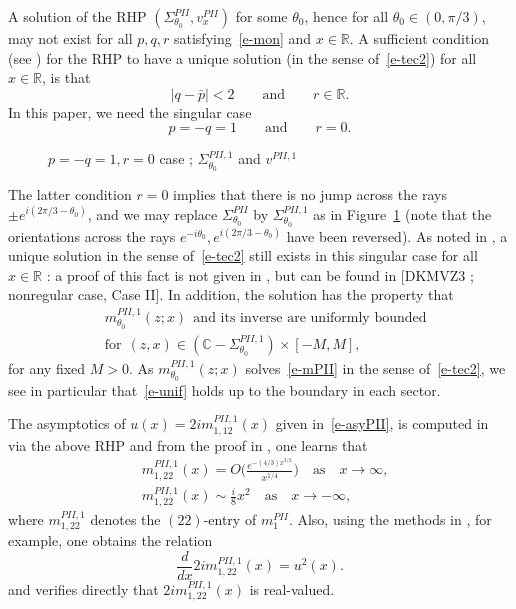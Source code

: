 \documentclass{amsart}
\theoremstyle{definition}
\theoremstyle{remark}
\numberwithin{equation}{section}
\newcommand{\C}{\mathbb C}
\newcommand{\R}{\mathbb R}
\begin{document}
A solution of the RHP $(\Sigma_{\theta_0}^{PII}, v_x^{PII})$ 
for some $\theta_0$, hence for all $\theta_0\in (0,\pi/3)$, may not exist 
for all $p,q,r$ satisfying~\eqref{e-mon} and $x\in\R$.
A sufficient condition (see \cite{FZ})  
for the RHP to have a unique solution (in the sense of~\eqref{e-tec2}) 
for all $x\in\R$, is that
\begin{equation*}
   |q-\bar{p}|<2 \qquad \text{and} \qquad r\in\R.  
\end{equation*}
In this paper, we need the singular case 
\begin{equation}
   p=-q=1 \qquad \text{and} \qquad r=0.
\end{equation}
\begin{figure}[ht]
 \centerline{}
 \caption{$p=-q=1,r=0$ case ; $\Sigma_{\theta_0}^{PII,1}$ and 
$v^{PII,1}$}\label{fig-PII1}
\end{figure}
The latter condition $r=0$ implies that 
there is no jump across the rays $\pm e^{i(2\pi/3-\theta_0)}$, 
and we may replace $\Sigma^{PII}_{\theta_0}$ by $\Sigma^{PII,1}_{\theta_0}$ 
as in Figure~\ref{fig-PII1} (note that the orientations across the rays 
$e^{-i\theta_0}, e^{i(2\pi/3-\theta_0)}$ have been reversed). 
As noted in \cite{DZ}, a unique solution in the sense of~\eqref{e-tec2} 
still exists in this singular case 
for all $x\in\R$ : a proof of this fact is not given in \cite{DZ}, 
but can be found in [DKMVZ3 ; nonregular case, Case II]. 
In addition, the solution has the property that 
\begin{equation}\label{e-unif}
  \begin{split}
   &m_{\theta_0}^{PII,1}(z;x) \ \ \text{and its inverse are uniformly bounded}\\
&\text{for}\ \  (z,x)\in(\C-\Sigma_{\theta_0}^{PII,1})\times[-M,M],
  \end{split}
\end{equation}
for any fixed $M>0$.
As $m^{PII,1}_{\theta_0}(z;x)$ solves~\eqref{e-mPII} 
in the sense of~\eqref{e-tec2}, we see 
in particular that~\eqref{e-unif} holds up to the boundary in each sector.

The asymptotics of $u(x)=2im_{1,12}^{PII,1}(x)$  
given in~\eqref{e-asyPII}, is computed in ~\cite{DZ} via the above RHP and 
from the proof in \cite{DZ}, one learns that 
\begin{equation}\label{e-aympm_1}
  \begin{split}
   &m^{PII,1}_{1,22}(x)=O\biggl(\frac{e^{-(4/3)x^{3/2}}}{x^{1/4}}\biggr) 
\quad \text{as} \quad x\to\infty,\\
   &m^{PII,1}_{1,22}(x)\sim \frac{i}8 x^2 \quad \text{as} \quad x\to -\infty,
  \end{split}
\end{equation}
where $m^{PII,1}_{1,22}$ denotes the $(22)$-entry of $m^{PII}_{1}$.
Also, using the methods in \cite{DZ}, for example, 
one obtains the relation
\begin{equation}\label{e-um1PII}
   \frac{d}{dx} 2im^{PII,1}_{1,22}(x) = u^2(x).
\end{equation}
and verifies directly that $2im^{PII,1}_{1,22}(x)$ is real-valued.
\end{document}
